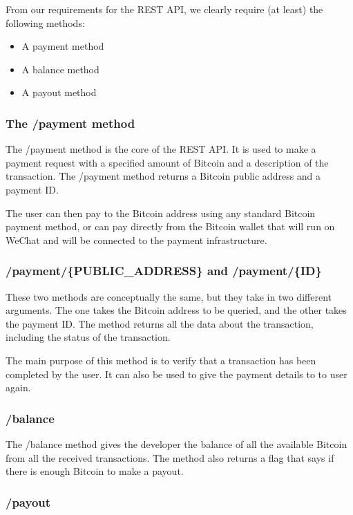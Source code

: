 From our requirements for the REST API, we clearly require (at least) the following methods:

\begin{itemize}
	\item A payment method
	\item A balance method
	\item A payout method
\end{itemize}

\subsubsection{The /payment method}
\label{sct:payment}

The /payment method is the core of the REST API. It is used to make a payment request with a specified amount of Bitcoin and a description of the transaction. The /payment method returns a Bitcoin public address and a payment ID. 

The user can then pay to the Bitcoin address using any standard Bitcoin payment method, or can pay directly from the Bitcoin wallet that will run on WeChat and will be connected to the payment infrastructure.

\subsubsection{/payment/\{PUBLIC\_ADDRESS\} and /payment/\{ID\}}

These two methods are conceptually the same, but they take in two different arguments. The one takes the Bitcoin address to be queried, and the other takes the payment ID. The method returns all the data about the transaction, including the status of the transaction. 

The main purpose of this method is to verify that a transaction has been completed by the user. It can also be used to give the payment details to to user again.

\subsubsection{/balance}

The /balance method gives the developer the balance of all the available Bitcoin from all the received transactions. The method also returns a flag that says if there is enough Bitcoin to make a payout.

\subsubsection{/payout}


